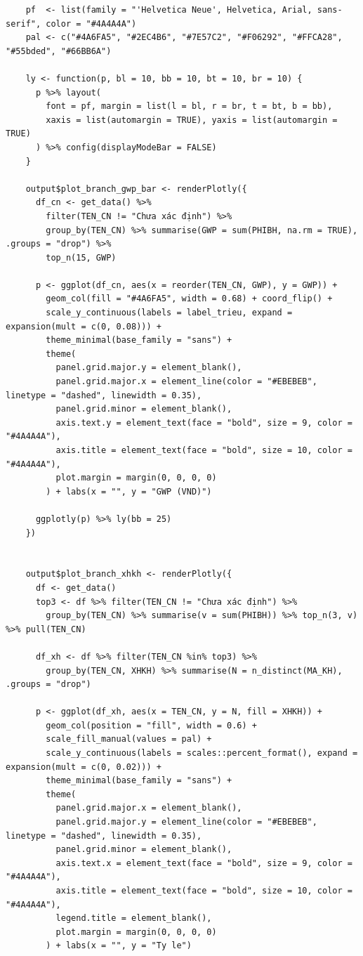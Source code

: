 \documentclass[12pt, a4paper]{article}
\begin{document}
\begin{lstlisting}
    pf  <- list(family = "'Helvetica Neue', Helvetica, Arial, sans-serif", color = "#4A4A4A")
    pal <- c("#4A6FA5", "#2EC4B6", "#7E57C2", "#F06292", "#FFCA28", "#55bded", "#66BB6A")

    ly <- function(p, bl = 10, bb = 10, bt = 10, br = 10) {
      p %>% layout(
        font = pf, margin = list(l = bl, r = br, t = bt, b = bb),
        xaxis = list(automargin = TRUE), yaxis = list(automargin = TRUE)
      ) %>% config(displayModeBar = FALSE)
    }

    output$plot_branch_gwp_bar <- renderPlotly({
      df_cn <- get_data() %>%
        filter(TEN_CN != "Chưa xác định") %>%
        group_by(TEN_CN) %>% summarise(GWP = sum(PHIBH, na.rm = TRUE), .groups = "drop") %>%
        top_n(15, GWP)

      p <- ggplot(df_cn, aes(x = reorder(TEN_CN, GWP), y = GWP)) +
        geom_col(fill = "#4A6FA5", width = 0.68) + coord_flip() +
        scale_y_continuous(labels = label_trieu, expand = expansion(mult = c(0, 0.08))) +
        theme_minimal(base_family = "sans") +
        theme(
          panel.grid.major.y = element_blank(),
          panel.grid.major.x = element_line(color = "#EBEBEB", linetype = "dashed", linewidth = 0.35),
          panel.grid.minor = element_blank(),
          axis.text.y = element_text(face = "bold", size = 9, color = "#4A4A4A"),
          axis.title = element_text(face = "bold", size = 10, color = "#4A4A4A"),
          plot.margin = margin(0, 0, 0, 0)
        ) + labs(x = "", y = "GWP (VND)")

      ggplotly(p) %>% ly(bb = 25)
    })


    output$plot_branch_xhkh <- renderPlotly({
      df <- get_data()
      top3 <- df %>% filter(TEN_CN != "Chưa xác định") %>%
        group_by(TEN_CN) %>% summarise(v = sum(PHIBH)) %>% top_n(3, v) %>% pull(TEN_CN)

      df_xh <- df %>% filter(TEN_CN %in% top3) %>%
        group_by(TEN_CN, XHKH) %>% summarise(N = n_distinct(MA_KH), .groups = "drop")

      p <- ggplot(df_xh, aes(x = TEN_CN, y = N, fill = XHKH)) +
        geom_col(position = "fill", width = 0.6) +
        scale_fill_manual(values = pal) +
        scale_y_continuous(labels = scales::percent_format(), expand = expansion(mult = c(0, 0.02))) +
        theme_minimal(base_family = "sans") +
        theme(
          panel.grid.major.x = element_blank(),
          panel.grid.major.y = element_line(color = "#EBEBEB", linetype = "dashed", linewidth = 0.35),
          panel.grid.minor = element_blank(),
          axis.text.x = element_text(face = "bold", size = 9, color = "#4A4A4A"),
          axis.title = element_text(face = "bold", size = 10, color = "#4A4A4A"),
          legend.title = element_blank(),
          plot.margin = margin(0, 0, 0, 0)
        ) + labs(x = "", y = "Ty le")


\end{lstlisting}
\end{document}
